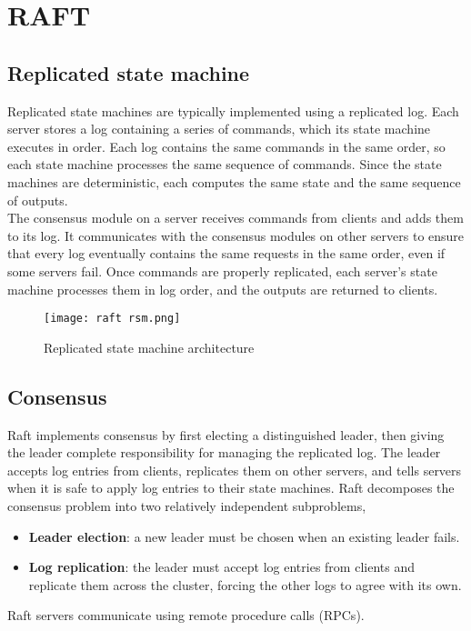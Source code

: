 \documentclass{article}
\begin{document}
\section{RAFT}
\subsection{Replicated state machine}
Replicated state machines are typically implemented
using a replicated log. Each server
stores a log containing a series of commands, which its
state machine executes in order. Each log contains the
same commands in the same order, so each state machine processes the same sequence of commands. Since
the state machines are deterministic, each computes the
same state and the same sequence of outputs. \\
The consensus module on a server
receives commands from clients and adds them to its log.
It communicates with the consensus modules on other
servers to ensure that every log eventually contains the
same requests in the same order, even if some servers fail.
Once commands are properly replicated, each server’s
state machine processes them in log order, and the outputs are returned to clients.
\begin{figure}[t]
\texttt{[image: raft rsm.png]}
\centering
\caption{Replicated state machine architecture}
\end{figure}
\subsection{Consensus}
Raft implements consensus by first electing a distinguished leader, then giving the leader complete responsibility for managing the replicated log. The leader accepts
log entries from clients, replicates them on other servers,
and tells servers when it is safe to apply log entries to
their state machines.
Raft decomposes the consensus problem into two relatively independent subproblems,
\begin{itemize}
    \item \textbf{Leader election}: a new leader must be chosen when an
existing leader fails.
\item \textbf{Log replication}: the leader must accept log entries
from clients and replicate them across the cluster, forcing the other logs to agree with its own.
\end{itemize}
Raft servers communicate using remote procedure calls
(RPCs).
\end{document}
